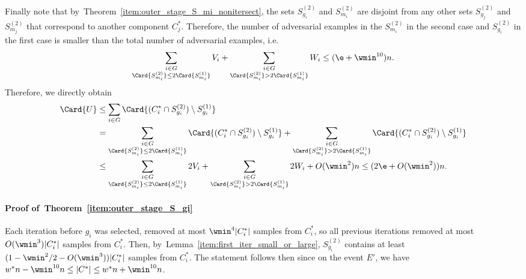 Finally note that  by~Theorem~\ref{item:outer_stage_S_mi_nonitersect}, the sets $S_{g_i}^{(2)}$ and $S_{m_i}^{(2)}$ are disjoint from any other sets $S_{g_{j}}^{(2)}$ and $S_{m_{j}}^{(2)}$ that correspond to another component $C_j^*$. Therefore, the number of adversarial examples in the $S_{m_i}^{(2)}$ in the second case and $S_{g_{i}}^{(2)}$ in the first case is smaller than the total number of adversarial examples, i.e.
\begin{equation*}
    \sum_{\substack{i \in G \\ \Card{S_{m_i}^{(2)}} \leq 2 \Card{S_{m_i}^{(1)}}}} V_i + \sum_{\substack{i \in G \\ \Card{S_{m_i}^{(2)}} > 2 \Card{S_{m_i}^{(1)}}}} W_i \leq (\e + \wmin^{10}) n.
\end{equation*}
Therefore, we directly obtain
\begin{equation*}
\begin{aligned}
    \Card{U} &\leq \sum_{i \in G} \Card{(C_i^* \cap S_{g_i}^{(2)}) \setminus S_{g_i}^{(1)}} \\
    & = \sum_{\substack{i \in G \\ \Card{S_{m_i}^{(2)}} \leq 2 \Card{S_{m_i}^{(1)}}}} \Card{(C_i^* \cap S_{g_i}^{(2)}) \setminus S_{g_i}^{(1)}} + \sum_{\substack{i \in G \\ \Card{S_{m_i}^{(2)}} > 2 \Card{S_{m_i}^{(1)}}}} \Card{(C_i^* \cap S_{g_i}^{(2)}) \setminus S_{g_i}^{(1)}} \\
    & \leq \sum_{\substack{i \in G \\ \Card{S_{m_i}^{(2)}} \leq 2 \Card{S_{m_i}^{(1)}}}} 2 V_i + \sum_{\substack{i \in G \\ \Card{S_{m_i}^{(2)}} > 2 \Card{S_{m_i}^{(1)}}}} 2 W_i + O(\wmin^2) n \leq (2\e + O(\wmin^2))n.
\end{aligned}
\end{equation*}
\paragraph{Proof of~Theorem~\ref{item:outer_stage_S_gi}}


Each iteration before \(g_i\) was selected, removed at most $\wmin^4 |C_i^*|$ samples from $C_i^*$, 
so all previous iterations removed at most $O(\wmin^3)|C_i^*|$ samples from $C_i^*$.
Then, by~Lemma~\ref{item:first_iter_small_or_large}, $S_{g_i}^{(2)}$ contains at least $(1-\wmin^{2}/2-O(\wmin^3))|C_i^*|$ samples from $C_i^*$.
The statement follows then since on the event $E'$, we have   
$w^*n - \wmin^{10} n \leq |C^*| \leq w^* n + \wmin^{10} n$. 

